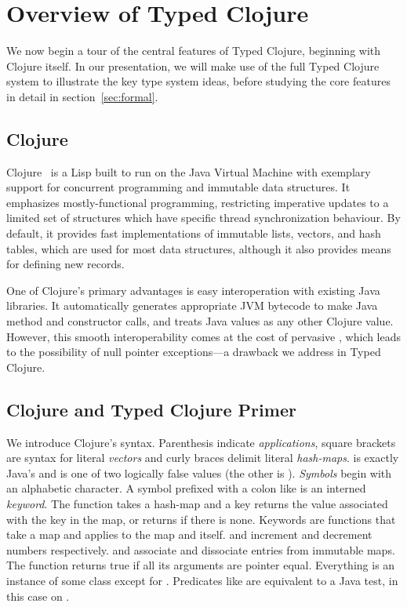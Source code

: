 \section{Overview of Typed Clojure}

\label{sec:overview}

We now begin a tour of the central features of Typed Clojure,
beginning with Clojure itself. In our presentation, we will make 
use of the full Typed Clojure system to illustrate the key type system
ideas, before studying the core features in detail in
section~\ref{sec:formal}. 

\subsection{Clojure}

Clojure~\cite{Hic08} is a Lisp built to run on the
Java Virtual Machine with exemplary support for concurrent programming
and immutable data structures. It emphasizes mostly-functional
programming, restricting imperative updates to a limited set of
structures which have specific thread synchronization behaviour. By
default, it provides fast implementations of immutable lists, vectors,
and hash tables, which are used for most data structures, although it
also provides means for defining new records.

One of Clojure's primary advantages is easy interoperation with
existing Java libraries. It automatically generates appropriate JVM
bytecode to make Java method and constructor calls, and treats Java
values as any other Clojure value. However, this smooth
interoperability comes at the cost of pervasive , which
leads to the possibility of null pointer exceptions---a drawback we
address in Typed Clojure.

\subsection{Clojure and Typed Clojure Primer}

We introduce Clojure's syntax.
Parenthesis indicate \emph{applications}, square brackets
are syntax for literal \emph{vectors} and curly braces delimit literal
\emph{hash-maps}.
 is exactly Java's  and is one of two logically
false values (the other is ).
\emph{Symbols} begin with an alphabetic character.
A symbol prefixed with a colon like  is an interned \emph{keyword}.
The  function takes a hash-map and a key returns the value
associated with the key in the map, or returns  if there is none.
Keywords are functions that take a map and applies  to the map
and itself.
 and  increment and decrement numbers respectively.
 and  associate and dissociate entries
from immutable maps.
The \clj{=} function returns true if all its arguments are pointer equal.
Everything is an instance of some class
except for . Predicates like  are equivalent to
a Java  test, in this case on .

